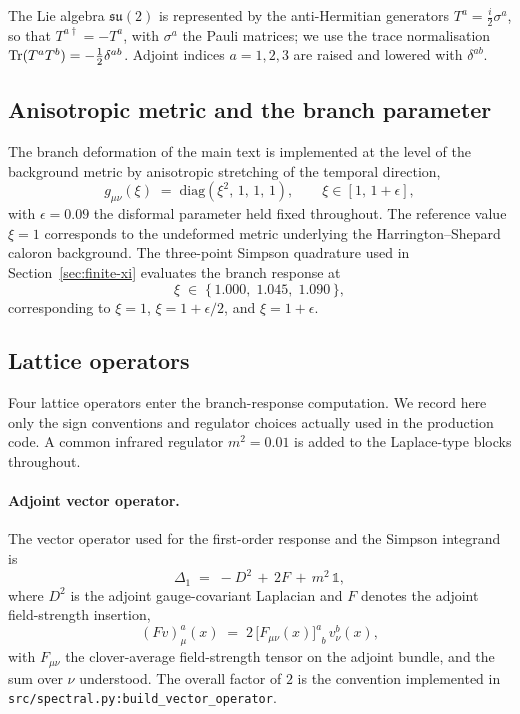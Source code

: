 \documentclass[a4paper,11pt]{article}
\theoremstyle{definition}
\newcommand{\Tr}{\mathop{\rm Tr}}
\begin{document}
The Lie algebra $\mathfrak{su}(2)$ is represented by the anti-Hermitian
generators $T^a = \tfrac{i}{2}\sigma^a$, so that $T^{a\dagger} = -T^a$, with
$\sigma^a$ the Pauli matrices; we use the trace normalisation
$\Tr(T^a T^b) = -\tfrac{1}{2}\delta^{ab}$. Adjoint indices $a = 1, 2, 3$
are raised and lowered with $\delta^{ab}$.

\subsection{Anisotropic metric and the branch parameter}
\label{app:conv-metric}

The branch deformation of the main text is implemented at the level of the
background metric by anisotropic stretching of the temporal direction,
\begin{equation}
g_{\mu\nu}(\xi) \;=\; \mathrm{diag}(\xi^2,\,1,\,1,\,1),
\qquad
\xi \in [1,\,1+\epsilon],
\label{eq:app-aniso-metric}
\end{equation}
with $\epsilon = 0.09$ the disformal parameter held fixed throughout. The
reference value $\xi = 1$ corresponds to the undeformed metric underlying
the Harrington--Shepard caloron background. The three-point Simpson
quadrature used in Section~\ref{sec:finite-xi} evaluates the branch
response at
\begin{equation}
\xi \;\in\; \{\,1.000,\;1.045,\;1.090\,\},
\label{eq:app-xi-grid}
\end{equation}
corresponding to $\xi = 1$, $\xi = 1 + \epsilon/2$, and $\xi = 1 + \epsilon$.

\subsection{Lattice operators}
\label{app:conv-operators}

Four lattice operators enter the branch-response computation. We record
here only the sign conventions and regulator choices actually used in the
production code. A common infrared regulator $m^2 = 0.01$ is added to the
Laplace-type blocks throughout.

\paragraph{Adjoint vector operator.}
The vector operator used for the first-order response and the Simpson
integrand is
\begin{equation}
\Delta_1 \;=\; -D^2 \,+\, 2F \,+\, m^2\,\mathbb{1},
\label{eq:app-Delta1}
\end{equation}
where $D^2$ is the adjoint gauge-covariant Laplacian and $F$ denotes the
adjoint field-strength insertion,
\begin{equation}
(F v)^a_\mu(x)
\;=\;
2\,\bigl[F_{\mu\nu}(x)\bigr]^a_{\phantom{a}b}\,v^b_\nu(x),
\label{eq:app-F-insertion}
\end{equation}
with $F_{\mu\nu}$ the clover-average field-strength tensor on the adjoint
bundle, and the sum over $\nu$ understood. The overall factor of $2$ is
the convention implemented in
\texttt{src/spectral.py:build\_vector\_operator}.
\end{document}
